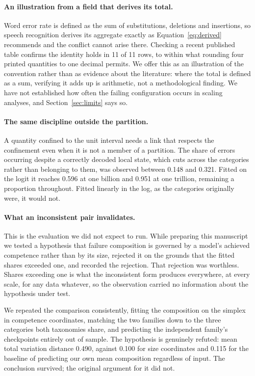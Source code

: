 \documentclass[11pt]{article}
\begin{document}
\paragraph{An illustration from a field that derives its total.}
Word error rate is defined as the sum of substitutions, deletions and insertions, so
speech recognition derives its aggregate exactly as Equation~\ref{eq:derived}
recommends and the conflict cannot arise there. Checking a recent published table
\citep{amit2025loquacious} confirms the identity holds in 11 of
11 rows, to within what rounding four printed quantities to one decimal
permits. We offer this as an illustration of the convention rather than as evidence
about the literature: where the total is defined as a sum, verifying it adds up is
arithmetic, not a methodological finding. We have not established how often the
failing configuration occurs in scaling analyses, and Section~\ref{sec:limits} says
so.

\paragraph{The same discipline outside the partition.}
A quantity confined to the unit interval needs a link that respects the confinement
even when it is not a member of a partition. The share of errors occurring despite
a correctly decoded local state, which cuts across the categories rather than
belonging to them, was observed between 0.148 and
0.321. Fitted on the logit it reaches 0.596 at one
billion and 0.951 at one trillion, remaining a proportion throughout.
Fitted linearly in the log, as the categories originally were, it would not.

\paragraph{What an inconsistent pair invalidates.}
This is the evaluation we did not expect to run. While preparing this manuscript we
tested a hypothesis that failure composition is governed by a model's achieved
competence rather than by its size, rejected it on the grounds that the fitted shares
exceeded one, and recorded the rejection. That rejection was worthless. Shares
exceeding one is what the inconsistent form produces everywhere, at every scale, for
any data whatever, so the observation carried no information about the hypothesis
under test.

We repeated the comparison consistently, fitting the composition on the simplex in
competence coordinates, matching the two families down to the three categories both
taxonomies share, and predicting the independent family's checkpoints entirely out of
sample. The hypothesis is genuinely refuted: mean total variation distance
0.490, against 0.100 for size coordinates and
0.115 for the baseline of predicting our own mean composition
regardless of input. The conclusion survived; the original argument for it did not.
\end{document}
